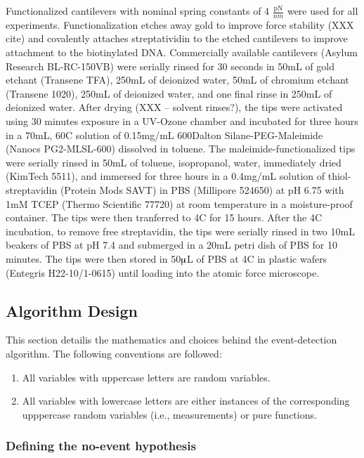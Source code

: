 \documentclass[%
  aip,12pt,tightenlines,
  amsthm,
 amsmath,amssymb
]{article}
\newcommand{\firstp}[0]{}
\newcommand{\pl}[0]{\vspace{6pt}}
\newcommand{\supply}[2]{(#1 #2)}
\newcommand{\degreeC}[0]{\degree{}C}
\begin{document}
\firstp Functionalized cantilevers with nominal spring constants of 4 $\frac{\text{pN}}{nm}$  were used for all experiments. Functionalization etches away gold to improve force stability (XXX cite) and covalently attaches streptatividin to the etched cantilevers to improve attachment to the biotinylated DNA. Commercially available cantilevers \supply{Asylum Research}{BL-RC-150VB} were serially rinsed for 30 seconds in 50mL of gold etchant \supply{Transene}{TFA}, 250mL of deionized water, 50mL of chromium etchant \supply{Transene}{1020}, 250mL of deionized water, and one final rinse in 250mL of deionized water. After drying (XXX -- solvent rinses?), the tips were activated using 30 minutes exposure in a UV-Ozone chamber and incubated for three hours in a 70mL, 60\degreeC{} solution of 0.15mg/mL 600Dalton Silane-PEG-Maleimide \supply{Nanocs}{PG2-MLSL-600} dissolved in toluene. The maleimide-functionalized tips were serially rinsed in 50mL of toluene, isopropanol, water, immediately dried \supply{KimTech}{5511}, and immersed for three hours in a 0.4mg/mL solution of thiol-streptavidin \supply{Protein Mods}{SAVT} in PBS \supply{Millipore}{524650} at pH 6.75 with 1mM TCEP \supply{Thermo Scientific}{77720} at room temperature in a moisture-proof container. The tips were then tranferred to 4\degreeC{} for 15 hours. After the 4\degreeC{} incubation, to remove free streptavidin, the tips were serially rinsed in two 10mL beakers of PBS at pH 7.4 and submerged in a 20mL petri dish of PBS for 10 minutes. The tips were then stored in 50$\muup$L of PBS at 4C in plastic wafers \supply{Entegris}{H22-10/1-0615} until loading into the atomic force microscope. \pl


\subsection{Algorithm Design}

This section detailis the mathematics and choices behind the event-detection algorithm. The following conventions are followed:

\begin{enumerate}
 \item All variables with uppercase letters are random variables.
 \item All variables with lowercase letters are either instances of the corresponding upppercase random variables (i.e., measurements) or pure functions. 
\end{enumerate}

\subsubsection{Defining the no-event hypothesis}
\end{document}
